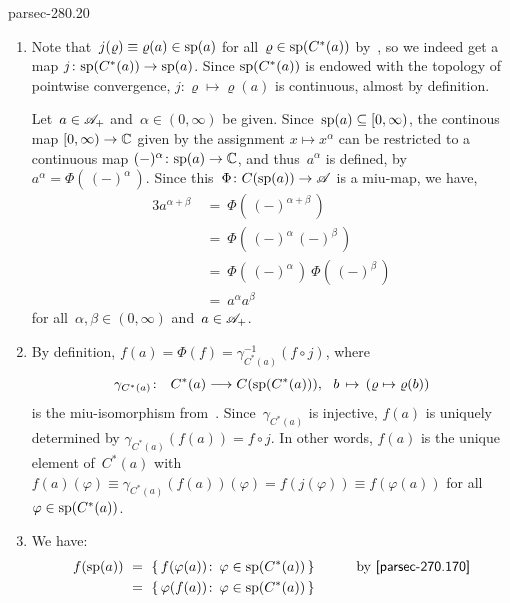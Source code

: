 \documentclass[b5page]{book}
\begin{document}
\begin{solution}{parsec-280.20}
\begin{enumerate}
It remains to be shown that $a$ and~$a^*$
commute precisely when~$\Real{a}$ and~$\Imag{a}$ commute.
Since $a=\Real{a}+i\Imag{a}$
and $a^*=\Real{a}-i\Imag{a}$ (by~),
we see that~$a$ and~$a^*$ commute provided that $\Real{a}$ and~$\Imag{a}$
commute.
The other direction follows from the equalities
$\Real{a}=\frac{1}{2}(a+a^*)$
and~$\Imag{a}=\frac{1}{2i}(a-a^*)$
(see~).

\item
Note that~$j(\varrho)\equiv 
\varrho(a)\in\mathrm{sp}(a)$ for all~$\varrho\in\mathrm{sp}(C^*(a))$ 
by~,
so we indeed get a map $j\colon \mathrm{sp}(C^*(a))\to\mathrm{sp}(a)$.
Since $\mathrm{sp}(C^*(a))$
is endowed with the topology of pointwise convergence,
$j\colon \varrho\mapsto \varrho(a)$
is continuous, almost by definition.

Let~$a\in \mathscr{A}_+$ and~$\alpha\in (0,\infty)$ be given.
Since~$\mathrm{sp}(a)\subseteq[0,\infty)$,
the continous map 
$[0,\infty)\to \mathbb{C}$
given
by the assignment $x\mapsto x^\alpha$
can be restricted
to a continuous map $(-)^\alpha\colon \mathrm{sp}(a)\to\mathbb{C}$,
and thus~$a^\alpha$ is defined,
by $a^\alpha = \Phi(\,(-)^\alpha\,)$.
Since this~$\Phi\colon C(\mathrm{sp}(a))\to\mathscr{A}$
is a miu-map,
we have,
\begin{alignat*}{3}
a^{\alpha +\beta} \ &=\  \Phi(\,(-)^{\alpha+\beta}\,)
\\
\ &=\  \Phi(\,(-)^\alpha\,(-)^\beta\,) 
\\
&=\  \Phi(\,(-)^\alpha\,)\ \Phi(\,(-)^\beta\,) 
\\
&=\  a^\alpha a^\beta
\end{alignat*}
for all~$\alpha,\beta\in(0,\infty)$ and~$a\in\mathscr{A}_+$.
\item
By definition,
$f(a)=\Phi(f)=\gamma_{C^*(a)}^{-1}(f\circ j)$,
where
$$ \gamma_{C^*(a)}\colon\ \ 
C^*(a)\longrightarrow C(\spec( C^*(a))),\ \ 
b\,\mapsto\, (\varrho \mapsto \varrho(b))
$$
is the miu-isomorphism from~.
Since~$\gamma_{C^*(a)}$
is injective,
$f(a)$ is uniquely determined by
$\gamma_{C^*(a)}(f(a))=f\circ j$.
In other words,
$f(a)$ is the unique
element of~$C^*(a)$
with
$f(a)(\varphi)\equiv \gamma_{C^*(a)}(f(a))(\varphi)
= f(j(\varphi))\equiv f(\varphi(a))$
for all~$\varphi \in \mathrm{sp}(C^*(a))$.
\item
We have:
\begin{alignat*}{3}
f(\spec(a))
\ &=\ 
\{\, f(\varphi(a))\colon \, \varphi\in \spec(C^*(a))\,\}
\qquad&&\text{by~\sref{parsec-270.170}} \\
\ &=\ 
\{\, \varphi(f(a))\colon \, \varphi\in \spec(C^*(a))\,\}

\end{alignat*}
\end{enumerate}
\end{solution}
\end{document}
